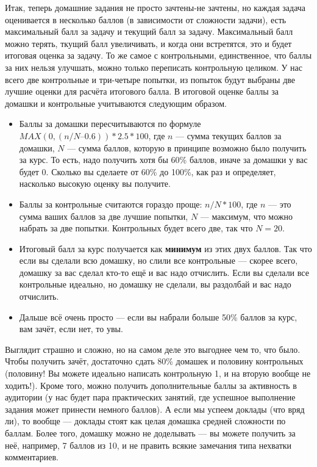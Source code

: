 \documentclass[a5paper]{article}
\begin{document}
Итак, теперь домашние задания не просто зачтены-не зачтены, но каждая задача оценивается в несколько баллов (в зависимости от сложности задачи), есть максимальный балл за задачу и текущий балл за задачу. Максимальный балл можно терять, ткущий балл увеличивать, и когда они встретятся, это и будет итоговая оценка за задачу. То же самое с контрольными, единственное, что баллы за них нельзя улучшать, можно только переписать контрольную целиком. У нас всего две контрольные и три-четыре попытки, из попыток будут выбраны две лучшие оценки для расчёта итогового балла. В итоговой оценке баллы за домашки и контрольные учитываются следующим образом.

\begin{itemize}
    \item Баллы за домашки пересчитываются по формуле $MAX(0, (n/N – 0.6)) * 2.5 * 100$, где $n$ --- сумма текущих баллов за домашки, $N$ --- сумма баллов, которую в принципе возможно было получить за курс. То есть, надо получить хотя бы 60\% баллов, иначе за домашки у вас будет 0. Сколько вы сделаете от 60\% до 100\%, как раз и определяет, насколько высокую оценку вы получите.
    \item Баллы за контрольные считаются гораздо проще: $n/N * 100$, где $n$ --- это сумма ваших баллов за две лучшие попытки, $N$ --- максимум, что можно набрать за две попытки. Контрольных будет всего две, так что $N = 20$.
    \item Итоговый балл за курс получается как \textbf{минимум} из этих двух баллов. Так что если вы сделали всю домашку, но слили все контрольные --- скорее всего, домашку за вас сделал кто-то ещё и вас надо отчислить. Если вы сделали все контрольные идеально, но домашку не сделали, вы раздолбай и вас надо отчислить.
    \item Дальше всё очень просто --- если вы набрали больше 50\% баллов за курс, вам зачёт, если нет, то увы.
\end{itemize}

Выглядит страшно и сложно, но на самом деле это выгоднее чем то, что было. Чтобы получить зачёт, достаточно сдать 80\% домашек и половину контрольных (половину! Вы можете идеально написать контрольную 1, и на вторую вообще не ходить!). Кроме того, можно получить дополнительные баллы за активность в аудитории (у нас будет пара практических занятий, где успешное выполнение задания может принести немного баллов). А если мы успеем доклады (что вряд ли), то вообще --- доклады стоят как целая домашка средней сложности по баллам. Более того, домашку можно не доделывать --- вы можете получить за неё, например, 7 баллов из 10, и не править всякие замечания типа нехватки комментариев.
\end{document}
